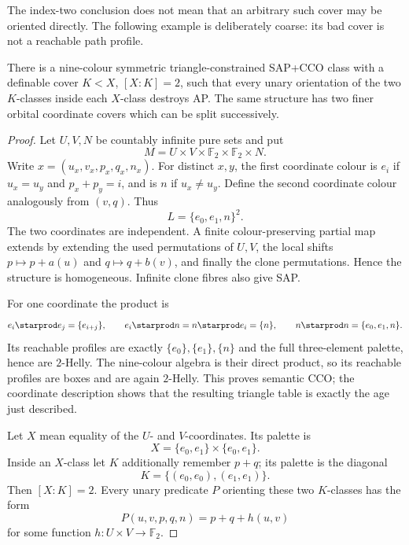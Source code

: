 The index-two conclusion does not mean that an arbitrary such cover may be
oriented directly.  The following example is deliberately coarse: its bad
cover is not a reachable path profile.

\begin{proposition}
\label{prop:bad-diagonal-split}
There is a nine-colour symmetric triangle-constrained SAP+CCO class with a
definable cover $K<X$, $[X:K]=2$, such that every unary orientation of the two
$K$-classes inside each $X$-class destroys AP.  The same structure has two
finer orbital coordinate covers which can be split successively.
\end{proposition}

\begin{proof}
Let $U,V,N$ be countably infinite pure sets and put
\[
 M=U\times V\times\mathbb F_2\times\mathbb F_2\times N.
\]
Write $x=(u_x,v_x,p_x,q_x,n_x)$.  For distinct $x,y$, the first coordinate
colour is $e_i$ if $u_x=u_y$ and $p_x+p_y=i$, and is $n$ if $u_x\ne u_y$.
Define the second coordinate colour analogously from $(v,q)$.  Thus
\[
 L=\{e_0,e_1,n\}^2.
\]
The two coordinates are independent.  A finite colour-preserving partial map
extends by extending the used permutations of $U,V$, the local shifts
$p\mapsto p+a(u)$ and $q\mapsto q+b(v)$, and finally the clone permutations.
Hence the structure is homogeneous.  Infinite clone fibres also give SAP.

For one coordinate the product is
\[
 e_i\starprod e_j=\{e_{i+j}\},\qquad
 e_i\starprod n=n\starprod e_i=\{n\},\qquad
 n\starprod n=\{e_0,e_1,n\}.
\]
Its reachable profiles are exactly
$\{e_0\},\{e_1\},\{n\}$ and the full three-element palette, hence are
$2$-Helly.  The nine-colour algebra is their direct product, so its reachable
profiles are boxes and are again $2$-Helly.  This proves semantic CCO; the
coordinate description shows that the resulting triangle table is exactly
the age just described.

Let $X$ mean equality of the $U$- and $V$-coordinates.  Its palette is
\[
 X=\{e_0,e_1\}\times\{e_0,e_1\}.
\]
Inside an $X$-class let $K$ additionally remember $p+q$; its palette is the
diagonal
\[
 K=\{(e_0,e_0),(e_1,e_1)\}.
\]
Then $[X:K]=2$.  Every unary predicate $P$ orienting these two $K$-classes has
the form
\[
 P(u,v,p,q,n)=p+q+h(u,v)
\tag{3}\label{eq:bad-diagonal-orientation}
\]
for some function $h:U\times V\to\mathbb F_2$.


\end{proof}
